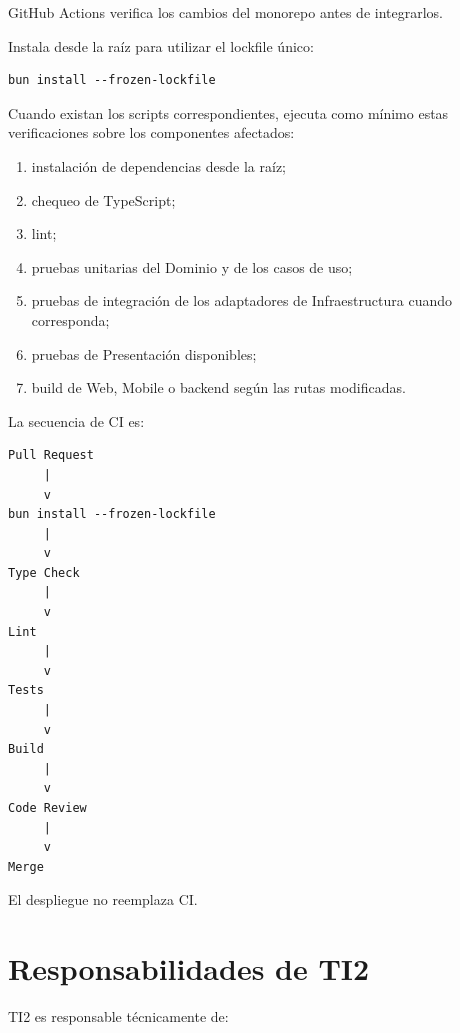 \documentclass[11pt,a4paper]{article}
\begin{document}
GitHub Actions verifica los cambios del monorepo antes de integrarlos.

Instala desde la raíz para utilizar el lockfile único:

\begin{lstlisting}
bun install --frozen-lockfile
\end{lstlisting}

Cuando existan los scripts correspondientes, ejecuta como mínimo estas
verificaciones sobre los componentes afectados:

\begin{enumerate}
  \item instalación de dependencias desde la raíz;
  \item chequeo de TypeScript;
  \item lint;
  \item pruebas unitarias del Dominio y de los casos de uso;
  \item pruebas de integración de los adaptadores de Infraestructura cuando
    corresponda;
  \item pruebas de Presentación disponibles;
  \item build de Web, Mobile o backend según las rutas modificadas.
\end{enumerate}

La secuencia de CI es:

\begin{lstlisting}
Pull Request
     |
     v
bun install --frozen-lockfile
     |
     v
Type Check
     |
     v
Lint
     |
     v
Tests
     |
     v
Build
     |
     v
Code Review
     |
     v
Merge
\end{lstlisting}

El despliegue no reemplaza CI.

\section{Responsabilidades de TI2}

TI2 es responsable técnicamente de:
\end{document}

